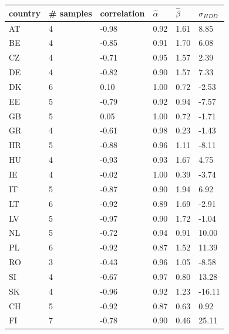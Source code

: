 \documentclass[12pt]{article}
\begin{document}
\begin{table}[h!]
\centering
\begin{tabular}{l|lllll}
country & \# samples & correlation        & $\hat{\alpha}$             & $\hat{\beta}$          & $\sigma_{HDD}$ \\ \hline
AT & 4          & -0.98       & 0.92  & 1.61      & 8.85              \\
BE & 4          & -0.85       & 0.91  & 1.70      & 6.08              \\
CZ & 4          & -0.71       & 0.95  & 1.57      & 2.39              \\
DE & 4          & -0.82       & 0.90  & 1.57      & 7.33              \\
DK & 6          & 0.10        & 1.00  & 0.72      & -2.53             \\
EE & 5          & -0.79       & 0.92  & 0.94      & -7.57             \\
GB & 5          & 0.05        & 1.00  & 0.72      & -1.71             \\
GR & 4          & -0.61       & 0.98  & 0.23      & -1.43             \\
HR & 5          & -0.88       & 0.96  & 1.11      & -8.11             \\
HU & 4          & -0.93       & 0.93  & 1.67      & 4.75              \\
IE & 4          & -0.02       & 1.00  & 0.39      & -3.74             \\
IT & 5          & -0.87       & 0.90  & 1.94      & 6.92              \\
LT & 6          & -0.92       & 0.89  & 1.69      & -2.91             \\
LV & 5          & -0.97       & 0.90  & 1.72      & -1.04             \\
NL & 5          & -0.72       & 0.94  & 0.91      & 10.00             \\
PL & 6          & -0.92       & 0.87  & 1.52      & 11.39             \\
RO & 3          & -0.43       & 0.96  & 1.05      & -8.58             \\
SI & 4          & -0.67       & 0.97  & 0.80      & 13.28             \\
SK & 4          & -0.96       & 0.92  & 1.23      & -16.11            \\
CH & 5          & -0.92       & 0.87  & 0.63      & 0.92              \\
FI & 7          & -0.78       & 0.90  & 0.46      & 25.11             \\

\end{tabular}
\end{table}
\end{document}
